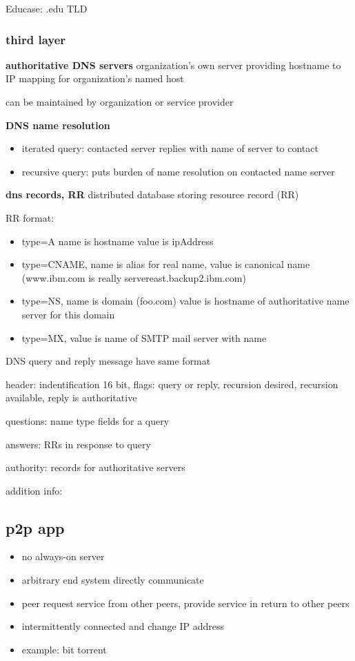 \documentclass[10pt]{article}
\theoremstyle{break}
\begin{document}
Educase: .edu TLD 

\subsubsection{third layer}
\textbf{authoritative DNS servers}
organization's own server providing hostname to IP mapping for organization's named host

can be maintained by organization or service provider

\textbf{DNS name resolution}
\begin{itemize}
    \item iterated query: contacted server replies with name of server to contact
    \item recursive query: puts burden of name resolution on contacted name server 
\end{itemize}

\textbf{dns records, RR}
distributed database storing resource record (RR)

RR format: 
\begin{itemize}
    \item type=A name is hostname value is ipAddress 
    \item type=CNAME,  name is alias for real name, value is canonical name (www.ibm.com is really servereast.backup2.ibm.com)
    \item type=NS, name is domain (foo.com) value is hostname of authoritative name server for this domain
    \item type=MX, value is name of SMTP mail server with name
\end{itemize}

DNS query and reply message have same format 

header: indentification 16 bit, flags: query or reply, recursion desired, recursion available, reply is authoritative

questions: name type fields for a query 

answers: RRs in response to query 

authority: records for authoritative servers 

addition info: 

\subsection{p2p app}
\begin{itemize}
    \item no always-on server 
    \item arbitrary end system directly communicate 
    \item peer request service from other peers, provide service in return to other peers 
    \item intermittently connected and change IP address 
    \item example: bit torrent 
\end{itemize}
\end{document}
